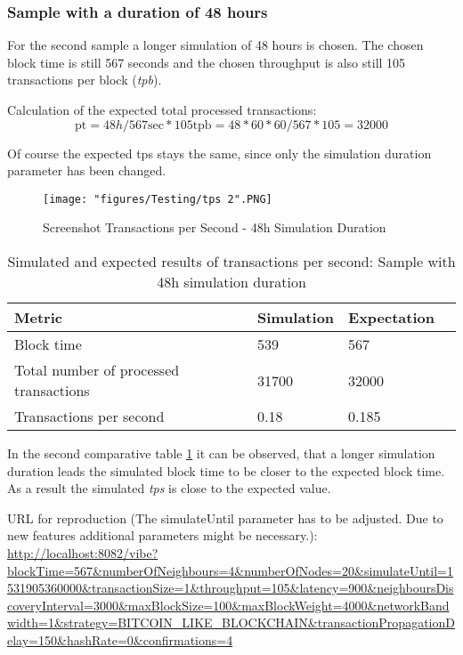 \subsubsection{Sample with a duration of 48 hours}

For the second sample a longer simulation of 48 hours is chosen. The chosen block time is still 567 seconds and the chosen throughput is also still 105 transactions per block (\textit{tpb}).

Calculation of the expected total processed transactions:
\begin{equation}
\text{pt} = 48h / 567 \text{sec} * 105 \text{tpb} = 48*60*60/567 * 105 = 32000
\end{equation}

Of course the expected tps stays the same, since only the simulation duration parameter has been changed.

\begin{figure}
\centering
\texttt{[image: "figures/Testing/tps 2".PNG]}
\caption{Screenshot Transactions per Second - 48h Simulation Duration\label{fig:tpsSimulation48h}}
\end{figure}

\begin{table}[ht]
\begin{adjustbox}{width=0.8\textwidth}
    \begin{tabular}{| l | l | l | l |}
    \hline
    \textbf{Metric} & \textbf{Simulation} & \textbf{Expectation}\\ \hline
    Block time & 539 & 567\\ \hline
    Total number of processed transactions & 
31700 & 32000 \\ \hline
    Transactions per second & 0.18 & 0.185\\ \hline
    \end{tabular}
\end{adjustbox}
    \caption{Simulated and expected results of transactions per second: Sample with 48h simulation duration\label{table:tps48hsimulation}}
\end{table} 

In the second comparative table \ref{table:tps48hsimulation} it can be observed, that a longer simulation duration leads the simulated block time to be closer to the expected block time. As a result the simulated \textit{tps} is close to the expected value.

URL for reproduction (The simulateUntil parameter has to be adjusted. Due to new features additional parameters might be necessary.):\linebreak
\url{http://localhost:8082/vibe?blockTime=567&numberOfNeighbours=4&numberOfNodes=20&simulateUntil=1531905360000&transactionSize=1&throughput=105&latency=900&neighboursDiscoveryInterval=3000&maxBlockSize=100&maxBlockWeight=4000&networkBandwidth=1&strategy=BITCOIN_LIKE_BLOCKCHAIN&transactionPropagationDelay=150&hashRate=0&confirmations=4}


